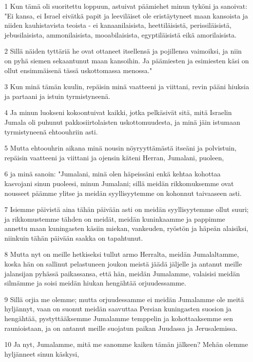 \par 1 Kun tämä oli suoritettu loppuun, astuivat päämiehet minun tyköni ja sanoivat: "Ei kansa, ei Israel eivätkä papit ja leeviläiset ole eristäytyneet maan kansoista ja niiden kauhistavista teoista - ei kanaanilaisista, heettiläisistä, perissiläisistä, jebusilaisista, ammonilaisista, mooabilaisista, egyptiläisistä eikä amorilaisista.
\par 2 Sillä näiden tyttäriä he ovat ottaneet itsellensä ja pojillensa vaimoiksi, ja niin on pyhä siemen sekaantunut maan kansoihin. Ja päämiesten ja esimiesten käsi on ollut ensimmäisenä tässä uskottomassa menossa."
\par 3 Kun minä tämän kuulin, repäisin minä vaatteeni ja viittani, revin pääni hiuksia ja partaani ja istuin tyrmistyneenä.
\par 4 Ja minun luokseni kokoontuivat kaikki, jotka pelkäsivät sitä, mitä Israelin Jumala oli puhunut pakkosiirtolaisten uskottomuudesta, ja minä jäin istumaan tyrmistyneenä ehtoouhriin asti.
\par 5 Mutta ehtoouhrin aikana minä nousin nöyryyttämästä itseäni ja polvistuin, repäisin vaatteeni ja viittani ja ojensin käteni Herran, Jumalani, puoleen,
\par 6 ja minä sanoin: "Jumalani, minä olen häpeissäni enkä kehtaa kohottaa kasvojani sinun puoleesi, minun Jumalani; sillä meidän rikkomuksemme ovat nousseet päämme ylitse ja meidän syyllisyytemme on kohonnut taivaaseen asti.
\par 7 Isiemme päivistä aina tähän päivään asti on meidän syyllisyytemme ollut suuri; ja rikkomustemme tähden on meidät, meidän kuninkaamme ja pappimme annettu maan kuningasten käsiin miekan, vankeuden, ryöstön ja häpeän alaisiksi, niinkuin tähän päivään saakka on tapahtunut.
\par 8 Mutta nyt on meille hetkiseksi tullut armo Herralta, meidän Jumalaltamme, koska hän on sallinut pelastuneen joukon meistä jäädä jäljelle ja antanut meille jalansijan pyhässä paikassansa, että hän, meidän Jumalamme, valaisisi meidän silmämme ja soisi meidän hiukan hengähtää orjuudessamme.
\par 9 Sillä orjia me olemme; mutta orjuudessamme ei meidän Jumalamme ole meitä hyljännyt, vaan on suonut meidän saavuttaa Persian kuningasten suosion ja hengähtää, pystyttääksemme Jumalamme temppelin ja kohottaaksemme sen raunioistaan, ja on antanut meille suojatun paikan Juudassa ja Jerusalemissa.
\par 10 Ja nyt, Jumalamme, mitä me sanomme kaiken tämän jälkeen? Mehän olemme hyljänneet sinun käskysi,
